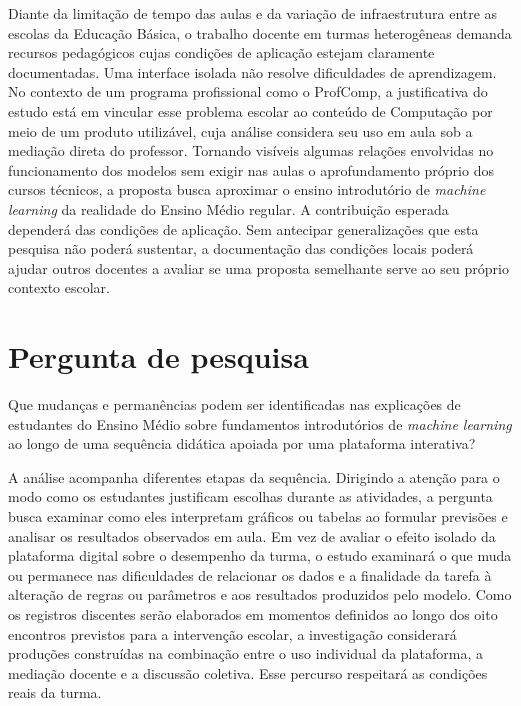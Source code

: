 Diante da limitação de tempo das aulas e da variação de infraestrutura entre as escolas da Educação Básica, o trabalho docente em turmas heterogêneas demanda recursos pedagógicos cujas condições de aplicação estejam claramente documentadas. Uma interface isolada não resolve dificuldades de aprendizagem. No contexto de um programa profissional como o ProfComp, a justificativa do estudo está em vincular esse problema escolar ao conteúdo de Computação por meio de um produto utilizável, cuja análise considera seu uso em aula sob a mediação direta do professor. Tornando visíveis algumas relações envolvidas no funcionamento dos modelos sem exigir nas aulas o aprofundamento próprio dos cursos técnicos, a proposta busca aproximar o ensino introdutório de \textit{machine learning} da realidade do Ensino Médio regular. A contribuição esperada dependerá das condições de aplicação. Sem antecipar generalizações que esta pesquisa não poderá sustentar, a documentação das condições locais poderá ajudar outros docentes a avaliar se uma proposta semelhante serve ao seu próprio contexto escolar.

\section{Pergunta de pesquisa}

Que mudanças e permanências podem ser identificadas nas explicações de estudantes do Ensino Médio sobre fundamentos introdutórios de \textit{machine learning} ao longo de uma sequência didática apoiada por uma plataforma interativa?

A análise acompanha diferentes etapas da sequência. Dirigindo a atenção para o modo como os estudantes justificam escolhas durante as atividades, a pergunta busca examinar como eles interpretam gráficos ou tabelas ao formular previsões e analisar os resultados observados em aula. Em vez de avaliar o efeito isolado da plataforma digital sobre o desempenho da turma, o estudo examinará o que muda ou permanece nas dificuldades de relacionar os dados e a finalidade da tarefa à alteração de regras ou parâmetros e aos resultados produzidos pelo modelo. Como os registros discentes serão elaborados em momentos definidos ao longo dos oito encontros previstos para a intervenção escolar, a investigação considerará produções construídas na combinação entre o uso individual da plataforma, a mediação docente e a discussão coletiva. Esse percurso respeitará as condições reais da turma.
